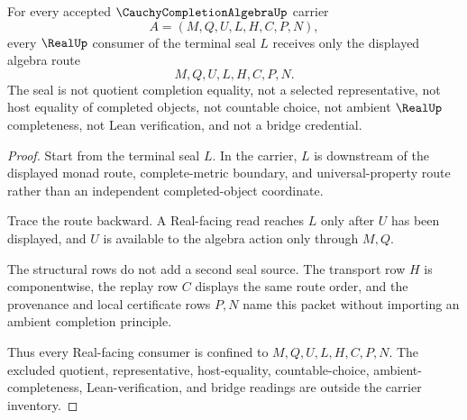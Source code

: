\begin{theorem}
\label{thm:cauchy-completion-algebra-real-seal-nonescape}
For every accepted $\CauchyCompletionAlgebraUp$ carrier
$$
A=(M,Q,U,L,H,C,P,N),
$$
every $\RealUp$ consumer of the terminal seal $L$ receives only the displayed algebra route
$$
M,Q,U,L,H,C,P,N .
$$
The seal is not quotient completion equality, not a selected representative, not host equality of completed objects, not countable choice, not ambient $\RealUp$ completeness, not Lean verification, and not a bridge credential.
\end{theorem}
\begin{proof}
Start from the terminal seal $L$. In the carrier, $L$ is downstream of the displayed monad route, complete-metric boundary, and universal-property route rather than an independent completed-object coordinate.

Trace the route backward. A Real-facing read reaches $L$ only after $U$ has been displayed, and $U$ is available to the algebra action only through $M,Q$.

The structural rows do not add a second seal source. The transport row $H$ is componentwise, the replay row $C$ displays the same route order, and the provenance and local certificate rows $P,N$ name this packet without importing an ambient completion principle.

Thus every Real-facing consumer is confined to $M,Q,U,L,H,C,P,N$. The excluded quotient, representative, host-equality, countable-choice, ambient-completeness, Lean-verification, and bridge readings are outside the carrier inventory.
\end{proof}


\begin{closurestatus}{\CauchyCompletionAlgebraUp}
  \theoryclosure{\seedClosure}
  \formalstatus{\unformalizedV}
\end{closurestatus}
